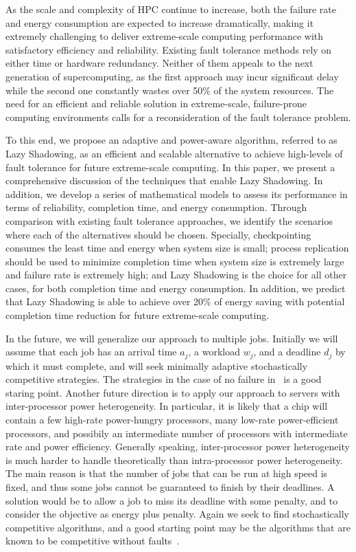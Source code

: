 As the scale and complexity of HPC continue to increase, both the failure rate and energy consumption are expected to increase dramatically, making it extremely challenging to deliver extreme-scale computing performance with satisfactory efficiency and reliability. Existing fault tolerance methods rely on either time or hardware redundancy. Neither of them appeals to the next generation of supercomputing, as the first approach may incur significant delay while the second one constantly wastes over 50\% of the system resources. The need for an efficient and reliable solution in extreme-scale, failure-prone computing environments calls for a reconsideration of the fault tolerance problem. 

To this end, we propose an adaptive and power-aware algorithm, referred to as Lazy Shadowing, as an efficient and scalable alternative to achieve high-levels of fault tolerance for future extreme-scale computing. In this paper, we present a comprehensive discussion of the techniques that enable Lazy Shadowing. In addition, we develop a series of mathematical models to assess its performance in terms of reliability, completion time, and energy consumption. 
Through comparison with existing fault tolerance approaches, we identify the scenarios where each of the alternatives should be chosen. Specially, checkpointing consumes the least time and energy when system size is small; process replication should be used to minimize completion time when system size is extremely large and failure rate is extremely high; and Lazy Shadowing is the choice for all other cases, for both completion time and energy consumption. 
In addition, we predict that Lazy Shadowing is able to achieve over 20\% of energy saving with potential completion time reduction for future extreme-scale computing. 

In the future, we will generalize our approach to multiple jobs. Initially we will assume that each job has an arrival time $a_j$, a workload $w_j$, and a deadline $d_j$ by which it must complete, and will seek minimally adaptive stochastically competitive strategies. The strategies in the case of no failure in~\cite{Albers:2011:MSS:1989493.1989539} is a good staring point. Another future direction is to apply our approach to servers with inter-processor power heterogeneity. In particular, it is likely that a chip will contain a few high-rate power-hungry processors, many low-rate power-efficient processors, and possibily an intermediate number of processors with intermediate rate and power efficiency. Generally speaking, inter-processor power heterogeneity is much harder to handle theoretically than intra-processor power heterogeneity. The main reason is that the number of jobs that can be run at high speed is fixed, and thus some jobs cannot be guaranteed to finish by their deadlines. A solution would be to allow a job to miss its deadline with some penalty, and to consider the objective as energy plus penalty. Again we seek to find stochastically competitive algorithms, and a good starting point may be the algorithms that are known to be competitive without faults~\cite{Kling:2013:PSM:2486159.2486183}.

